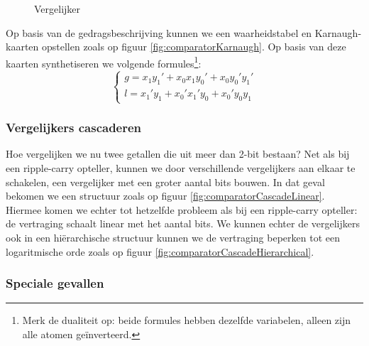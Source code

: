 \begin{figure}[hbt]
{
}
\caption{Vergelijker}
\end{figure}
Op basis van de gedragsbeschrijving kunnen we een waarheidstabel en Karnaugh-kaarten opstellen zoals op figuur \ref{fig:comparatorKarnaugh}. Op basis van deze kaarten synthetiseren we volgende formules\footnote{Merk de dualiteit op: beide formules hebben dezelfde variabelen, alleen zijn alle atomen ge\"inverteerd.}:
\begin{equation}
\left\{\begin{array}{l}
g=x_1y_1'+x_0x_1y_0'+x_0y_0'y_1'\\
l=x_1'y_1+x_0'x_1'y_0+x_0'y_0y_1
\end{array}\right.
\end{equation}
\subsubsection{Vergelijkers cascaderen}
Hoe vergelijken we nu twee getallen die uit meer dan 2-bit bestaan? Net als bij een ripple-carry opteller, kunnen we door verschillende vergelijkers aan elkaar te schakelen, een vergelijker met een groter aantal bits bouwen. In dat geval bekomen we een structuur zoals op figuur \ref{fig:comparatorCascadeLinear}. Hiermee komen we echter tot hetzelfde probleem als bij een ripple-carry opteller: de vertraging schaalt linear met het aantal bits. We kunnen echter de vergelijkers ook in een hi\"erarchische structuur kunnen we de vertraging beperken tot een logaritmische orde zoals op figuur \ref{fig:comparatorCascadeHierarchical}.
\subsubsection{Speciale gevallen}

